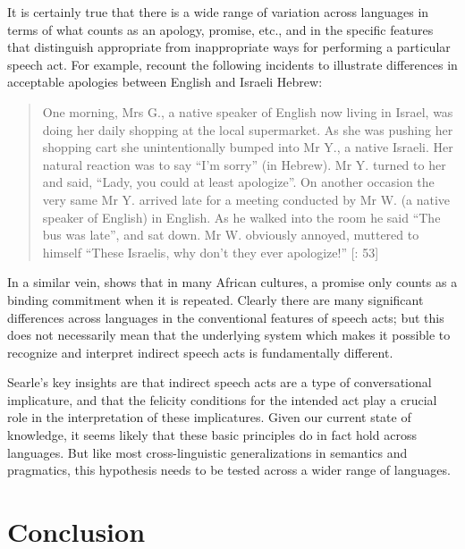 It is certainly true that there is a wide range of variation across languages in terms of what counts as an apology, promise, etc., and in the specific features that distinguish appropriate from inappropriate ways for performing a particular speech act. For example, \citet{OlshtainCohen1989} recount the following incidents to illustrate differences in acceptable apologies between English and Israeli Hebrew:


\begin{quote}
One morning, Mrs G., a native speaker of English now living in Israel, was doing her daily shopping at the local supermarket. As she was pushing her shopping cart she unintentionally bumped into Mr Y., a native Israeli. Her natural reaction was to say “I’m sorry” (in Hebrew). Mr Y. turned to her and said, “Lady, you could at least apologize”. On another occasion the very same Mr Y. arrived late for a meeting conducted by Mr W. (a native speaker of English) in English. As he walked into the room he said “The bus was late”, and sat down. Mr W. obviously annoyed, muttered to himself “These Israelis, why don’t they ever apologize!” [\citealt{OlshtainCohen1989}: 53]
\end{quote}


In a similar vein, \citet{Egner2002} shows that in many African cultures, a promise only counts as a binding commitment when it is repeated. Clearly there are many significant differences across languages in the conventional features of speech acts; but this does not necessarily mean that the underlying system which makes it possible to recognize and interpret indirect speech acts is fundamentally different.



Searle’s key insights are that indirect speech acts are a type of conversational implicature, and that the felicity conditions for the intended act play a crucial role in the interpretation of these implicatures. Given our current state of knowledge, it seems likely that these basic principles do in fact hold across languages. But like most cross-linguistic generalizations in semantics and pragmatics, this hypothesis needs to be tested across a wider range of languages.


\section{Conclusion}\label{sec:10.5}

